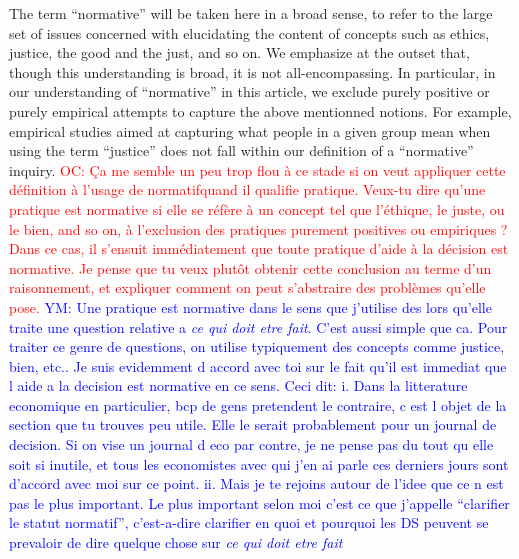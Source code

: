 \documentclass[preprint, french, english, 11pt]{elsarticle}%
\newcommand{\commentYM}[1]{\textcolor{blue}{YM: #1}}
\newcommand{\commentOC}[1]{\textcolor{red}{OC: #1}}
\begin{document}
 The term ``normative'' will be taken here in a broad sense, to refer to the large set of issues concerned with elucidating the content of concepts such as ethics, justice, the good and the just, and so on. We emphasize at the outset that, though this understanding is broad, it is not all-encompassing. In particular, in our understanding of ``normative'' in this article, we exclude purely positive or purely empirical attempts to capture the above mentionned notions. For example, empirical studies aimed at capturing what people in a given group mean when using the term ``justice'' does not fall within our definition of a ``normative'' inquiry.
\commentOC{Ça me semble un peu trop flou à ce stade si on veut appliquer cette définition à l’usage de \og{}normatif\fg quand il qualifie \og{}pratique\fg. Veux-tu dire qu’une pratique est normative si elle se réfère à un concept tel que l’éthique, le juste, ou le bien, and so on, à l’exclusion des pratiques purement positives ou empiriques ? Dans ce cas, il s’ensuit immédiatement que toute pratique d’aide à la décision est normative. Je pense que tu veux plutôt obtenir cette conclusion au terme d’un raisonnement, et expliquer comment on peut s’abstraire des problèmes qu’elle pose.}
\commentYM{Une pratique est normative dans le sens que j'utilise des lors qu'elle traite une question relative a \emph{ce qui doit etre fait}. C'est aussi simple que ca. Pour traiter ce genre de questions, on utilise typiquement des concepts comme justice, bien, etc.. Je suis evidemment d accord avec toi sur le fait qu'il est immediat que l aide a la decision est normative en ce sens. Ceci dit: 
i. Dans la litterature economique en particulier, bcp de gens pretendent le contraire, c est l objet de la section que tu trouves peu utile. Elle le serait probablement pour un journal de decision. Si on vise un journal d eco par contre, je ne pense pas du tout qu elle soit si inutile, et tous les economistes avec qui j'en ai parle ces derniers jours sont d'accord avec moi sur ce point.
ii. Mais je te rejoins autour de l'idee que ce n est pas le plus important. Le plus important selon moi c'est ce que j'appelle ``clarifier le statut normatif'', c'est-a-dire clarifier en quoi et pourquoi les DS peuvent se prevaloir de dire quelque chose sur \emph{ce qui doit etre fait}}
\end{document}
